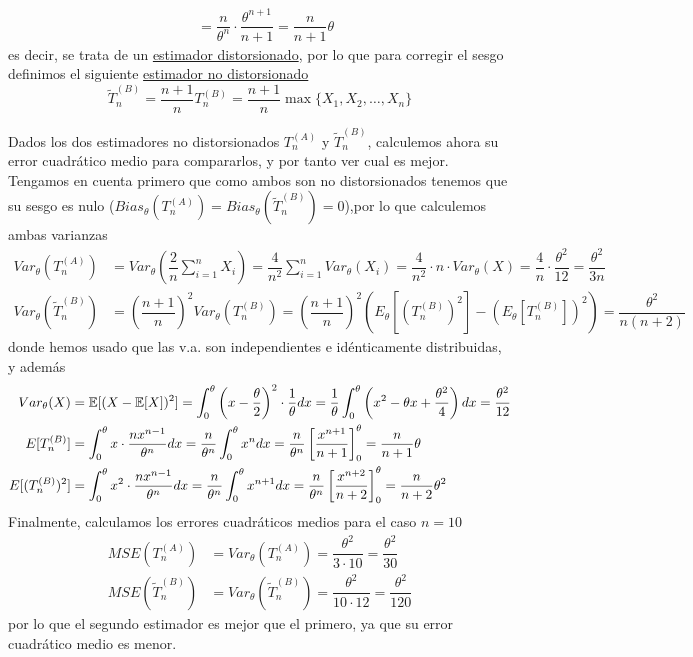 \begin{ejemplo}[Libro 7.3]
\begin{itemize}
\begin{align*}
            & = \dfrac{n}{\theta^n} \cdot \dfrac{\theta^{n+1}}{n+1} = \dfrac{n}{n+1} \theta
        \end{align*}
        es decir, se trata de un \underline{estimador distorsionado}, por lo que para corregir el sesgo definimos el siguiente \underline{estimador no distorsionado}
        \begin{equation*}
            \tilde{T}_n^{(B)} = \dfrac{n+1}{n} T_n^{(B)} = \dfrac{n+1}{n} \max\{X_1, X_2, \ldots, X_n\}
        \end{equation*}
    \end{itemize}
    Dados los dos estimadores no distorsionados $T_n^{(A)}$ y $\tilde{T}_n^{(B)}$, calculemos ahora su error cuadrático medio para compararlos, y por tanto ver cual es mejor. Tengamos en cuenta primero que como ambos son no distorsionados tenemos que su sesgo es nulo ($Bias_{\theta}(T_n^{(A)}) = Bias_{\theta}(\tilde{T}_n^{(B)}) = 0$),por lo que calculemos ambas varianzas
    \begin{align*}
        Var_{\theta}(T_n^{(A)}) &= Var_{\theta}\left( \dfrac{2}{n} \sum\limits_{i=1}^{n} X_i \right) = \dfrac{4}{n^2} \sum\limits_{i=1}^{n} Var_{\theta}(X_i) = \dfrac{4}{n^2} \cdot n \cdot Var_{\theta}(X) = \dfrac{4}{n} \cdot \dfrac{\theta^2}{12} = \dfrac{\theta^2}{3n} \\
        Var_{\theta}(\tilde{T}_n^{(B)}) &= \left( \dfrac{n+1}{n} \right)^2 Var_{\theta}(T_n^{(B)}) = \left( \dfrac{n+1}{n} \right)^2 \left( E_{\theta}[(T_n^{(B)})^2] - (E_{\theta}[T_n^{(B)}])^2 \right)=\dfrac{\theta^2}{n(n+2)}
    \end{align*}
    donde hemos usado que las v.a. son independientes e idénticamente distribuidas, y además 
    \begin{align*}
        Var_{\theta}(X) &= \mathbb{E}[(X - \mathbb{E}[X])^2] = \int_{0}^{\theta} \left(x- \dfrac{\theta}{2}\right)^2 \cdot \dfrac{1}{\theta} dx = \dfrac{1}{\theta} \int_{0}^{\theta} \left(x^2 - \theta x + \dfrac{\theta^2}{4}\right) dx = \dfrac{\theta^2}{12} \\
        E[T_n^{(B)}] &= \int_0^\theta x \cdot \frac{n x^{n-1}}{\theta^n} dx = \frac{n}{\theta^n} \int_0^\theta x^n dx = \frac{n}{\theta^n} \left[ \frac{x^{n+1}}{n+1} \right]_0^\theta = \frac{n}{n+1} \theta \\
        E[(T_n^{(B)})^2] &= \int_0^\theta x^2 \cdot \frac{n x^{n-1}}{\theta^n} dx = \frac{n}{\theta^n} \int_0^\theta x^{n+1} dx = \frac{n}{\theta^n} \left[ \frac{x^{n+2}}{n+2} \right]_0^\theta = \frac{n}{n+2} \theta^2
    \end{align*}
    Finalmente, calculamos los errores cuadráticos medios para el caso $n=10$
    \begin{align*}
        MSE(T_n^{(A)}) &= Var_{\theta}(T_n^{(A)}) = \dfrac{\theta^2}{3 \cdot 10} = \dfrac{\theta^2}{30} \\
        MSE(\tilde{T}_n^{(B)}) &= Var_{\theta}(\tilde{T}_n^{(B)}) = \dfrac{\theta^2}{10 \cdot 12} = \dfrac{\theta^2}{120}
    \end{align*}
    por lo que el segundo estimador es mejor que el primero, ya que su error cuadrático medio es menor.
\end{ejemplo}

